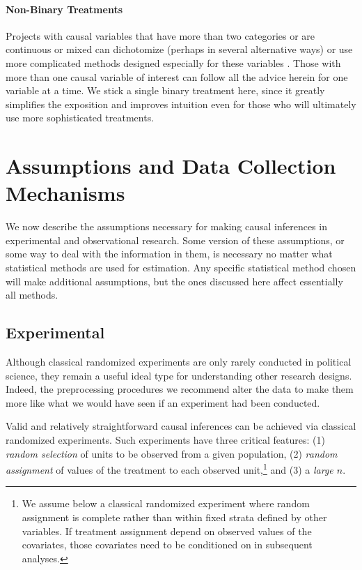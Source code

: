 \documentclass[11pt,titlepage]{article}
\begin{document}
\paragraph{Non-Binary Treatments}

Projects with causal variables that have more than two categories or
are continuous or mixed can dichotomize (perhaps in several
alternative ways) or use more complicated methods designed especially
for these variables \citep{ImaDyk04}.  Those with more than one causal
variable of interest can follow all the advice herein for one variable
at a time.  We stick a single binary treatment here, since it greatly
simplifies the exposition and improves intuition even for those who
will ultimately use more sophisticated treatments.

\section{Assumptions and Data Collection Mechanisms}

We now describe the assumptions necessary for making causal inferences
in experimental and observational research.  Some version of these
assumptions, or some way to deal with the information in them, is
necessary no matter what statistical methods are used for estimation.
Any specific statistical method chosen will make additional
assumptions, but the ones discussed here affect essentially all
methods.

\subsection{Experimental}

Although classical randomized experiments are only rarely conducted in
political science, they remain a useful ideal type for understanding
other research designs.  Indeed, the preprocessing procedures we
recommend alter the data to make them more like what we would have
seen if an experiment had been conducted.

Valid and relatively straightforward causal inferences can be achieved
via classical randomized experiments.  Such experiments have three
critical features: (1) \emph{random selection} of units to be observed
from a given population, (2) \emph{random assignment} of values of the
treatment to each observed unit,\footnote{We assume below a classical
  randomized experiment where random assignment is complete rather
  than within fixed strata defined by other variables.  If treatment
  assignment depend on observed values of the covariates, those
  covariates need to be conditioned on in subsequent analyses.} and
(3) a \emph{large $n$}.
\end{document}
